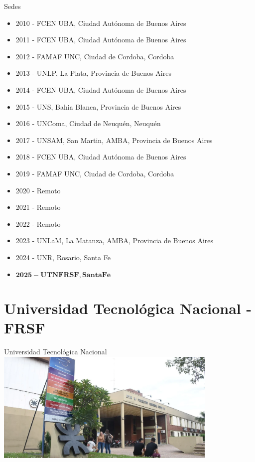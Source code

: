 \documentclass{beamer}
\begin{document}
\begin{frame}{Sedes}
    \begin{itemize}
        \item 2010 - FCEN UBA, Ciudad Autónoma de Buenos Aires
        \item 2011 - FCEN UBA, Ciudad Autónoma de Buenos Aires
        \item 2012 - FAMAF UNC, Ciudad de Cordoba, Cordoba
        \item 2013 - UNLP, La Plata, Provincia de Buenos Aires
        \item 2014 - FCEN UBA, Ciudad Autónoma de Buenos Aires
        \item 2015 - UNS, Bahia Blanca, Provincia de Buenos Aires
        \item 2016 - UNComa, Ciudad de Neuquén, Neuquén
        \item 2017 - UNSAM, San Martin, AMBA, Provincia de Buenos Aires
        \item 2018 - FCEN UBA, Ciudad Autónoma de Buenos Aires
        \item 2019 - FAMAF UNC, Ciudad de Cordoba, Cordoba
        \item 2020 - Remoto
        \item 2021 - Remoto
        \item 2022 - Remoto
        \item 2023 - UNLaM, La Matanza, AMBA, Provincia de Buenos Aires
        \item 2024 - UNR, Rosario, Santa Fe
        \item $\bm{2025 - UTN FRSF, Santa Fe}$
    \end{itemize}
\end{frame}

\section{Universidad Tecnológica Nacional - FRSF}

\begin{frame}{Universidad Tecnológica Nacional}
    \centering
    \includegraphics[width=0.8\textwidth]{img/utn_00.png}
\end{frame}
\end{document}
